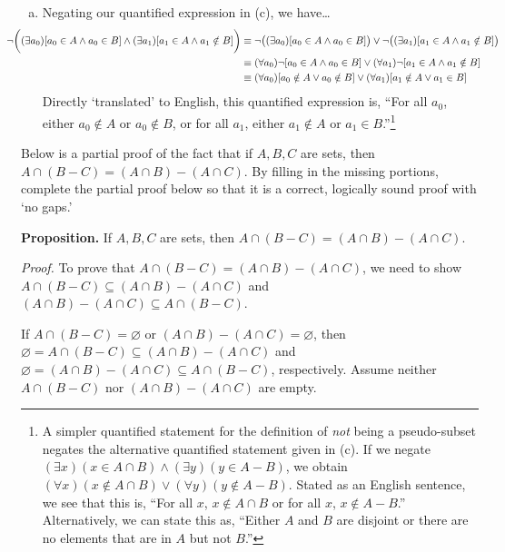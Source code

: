 \documentclass[11pt,letterpaper]{article}
\newcommand{\ansun}[2]{\underline{\hspace{#1}#2\hspace{#1}}} %
\begin{document}
\begin{enumerate}[(a)]
\item Negating our quantified expression in (c), we have\dots
	\[
	\begin{aligned}
	\hspace{-1.3cm} \neg \bigg( (\exists a_0) [a_0 \in A \wedge a_0 \in B] \wedge (\exists a_1) [a_1 \in A \wedge a_1 \notin B] \bigg) &\equiv \neg \big( (\exists a_0) [a_0 \in A \wedge a_0 \in B] \big) \vee \neg \big( (\exists a_1) [a_1 \in A \wedge a_1 \notin B] \big) \\
	&\equiv (\forall a_0) \neg [a_0 \in A \wedge a_0 \in B] \vee (\forall a_1) \neg [a_1 \in A \wedge a_1 \notin B] \\
	&\equiv (\forall a_0) [a_0 \notin A \vee a_0 \notin B] \vee (\forall a_1) [a_1 \notin A \vee a_1 \in B]
	\end{aligned}
	\]
Directly `translated' to English, this quantified expression is, ``For all $a_0$, either $a_0 \notin A$ or $a_0 \notin B$, or for all $a_1$, either $a_1 \notin A$ or $a_1 \in B$.''\footnote{A simpler quantified statement for the definition of \textit{not} being a pseudo-subset negates the alternative quantified statement given in (c). If we negate $(\exists x)(x \in A \cap B) \wedge (\exists y)(y \in A - B)$, we obtain $(\forall x)(x \notin A \cap B) \vee (\forall y)(y \notin A - B)$. Stated as an English sentence, we see that this is, ``For all $x$, $x \notin A \cap B$ or for all $x$, $x \notin A - B$.'' Alternatively, we can state this as, ``Either $A$ and $B$ are disjoint or there are no elements that are in $A$ but not $B$.''}
\end{enumerate}



\newpage



 Below is a partial proof of the fact that if $A, B, C$ are sets, then $A \cap (B - C)= (A \cap B) - (A \cap C)$. By filling in the missing portions, complete the partial proof below so that it is a correct, logically sound proof with `no gaps.' \pspace

\noindent \textbf{Proposition.} If $A, B, C$ are sets, then $A \cap (B - C)= (A \cap B) - (A \cap C)$. \pspace

\textit{Proof.} To prove that $A \cap (B - C)= (A \cap B) - (A \cap C)$, we need to show \ansun{0cm}{$A \cap (B - C) \subseteq (A \cap B) - (A \cap C)$} \pspace and \ansun{0cm}{$(A \cap B) - (A \cap C) \subseteq A \cap (B - C)$}. 

If $A \cap (B - C)= \varnothing$ or $(A \cap B) - (A \cap C)= \varnothing$, then $\varnothing= A \cap (B - C) \subseteq (A \cap B) - (A \cap C)$ and $\varnothing= (A \cap B) - (A \cap C) \subseteq A \cap (B - C)$, respectively. Assume neither $A \cap (B - C)$ nor $(A \cap B) - (A \cap C)$ are empty. 
\end{document}
